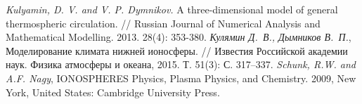\documentclass[14pt, a4paper, fleqn]{extarticle}
\begin{document}
\begin{thebibliography}{00}
\textit{Kulyamin, D. V. and V. P. Dymnikov.} A three-dimensional model of general thermospheric circulation. // Russian Journal of Numerical Analysis and Mathematical Modelling. 2013. 28(4): 353-380.
\textit{Кулямин Д.~В., Дымников В.~П.}, Моделирование климата нижней ионосферы. // Известия Российской академии наук. Физика атмосферы и океана, 2015. Т. 51(3): С. 317–337.
\textit{Schunk, R.W. and A.F. Nagy}, IONOSPHERES Physics, Plasma Physics, and Chemistry. 2009, New York, United States: Cambridge University Press.
\end{thebibliography}
\end{document}
